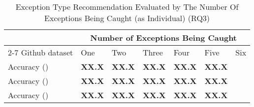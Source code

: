 \begin{table}[t]%
  \caption{Exception Type Recommendation Evaluated by The Number Of Exceptions Being Caught (\xtype as Individual) (RQ3)}
  \vspace{-12pt}
  \small
	\begin{center}
		\renewcommand{\arraystretch}{1}
		\begin{tabular}{| p{2.3cm}<{\centering} | p{0.8cm}<{\centering} | p{0.8cm}<{\centering}| p{0.8cm}<{\centering} | p{0.8cm}<{\centering} | p{0.8cm}<{\centering} | p{0.8cm}<{\centering} |}
		  \hline
			\multirow{2}{*}{} & \multicolumn{6}{c|}{Number of Exceptions Being Caught} \\
			\cline{2-7}
			 Github dataset & One & Two & Three & Four & Five & Six\\
			\hline
			Accuracy (\xtype) &  \textbf{XX.X} & \textbf{XX.X} & \textbf{XX.X} & \textbf{XX.X} & \textbf{XX.X}\\
			\hline
			Accuracy (\xtype) &  \textbf{XX.X} & \textbf{XX.X} & \textbf{XX.X} & \textbf{XX.X} & \textbf{XX.X}\\
			\hline
			Accuracy (\xtype) &  \textbf{XX.X} & \textbf{XX.X} & \textbf{XX.X} & \textbf{XX.X} & \textbf{XX.X}\\
			\hline
		\end{tabular}
		\label{tab:r3-xtype-1}
	\end{center}
\end{table}